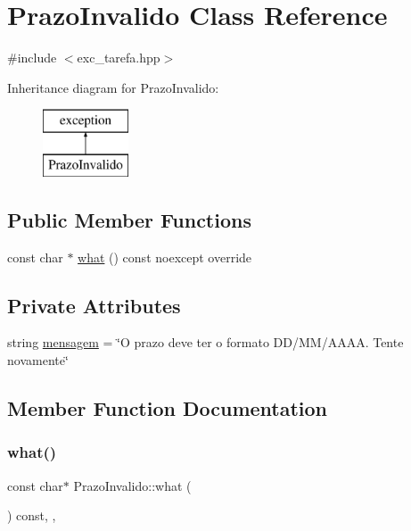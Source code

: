 \hypertarget{classPrazoInvalido}{}\section{Prazo\+Invalido Class Reference}
\label{classPrazoInvalido}


{\ttfamily \#include $<$exc\+\_\+tarefa.\+hpp$>$}

Inheritance diagram for Prazo\+Invalido\+:\begin{figure}[H]
\begin{center}
\leavevmode
\includegraphics[height=2.000000cm]{classPrazoInvalido}
\end{center}
\end{figure}
\subsection*{Public Member Functions}
\begin{DoxyCompactItemize}
\item 
const char $\ast$ \hyperlink{classPrazoInvalido_a17083a87d16651f20e9f1aac6edcea4c}{what} () const noexcept override
\end{DoxyCompactItemize}
\subsection*{Private Attributes}
\begin{DoxyCompactItemize}
\item 
string \hyperlink{classPrazoInvalido_af2bb20a8cc0b09f0b348e0ea2f9d18e8}{mensagem} = \char`\"{}O prazo deve ter o formato \textquotesingle{}DD/MM/A\+A\+AA\textquotesingle{}. Tente novamente\char`\"{}
\end{DoxyCompactItemize}


\subsection{Member Function Documentation}
\mbox{\label{classPrazoInvalido_a17083a87d16651f20e9f1aac6edcea4c}} 
\subsubsection{\texorpdfstring{what()}{what()}}
{\footnotesize\ttfamily const char$\ast$ Prazo\+Invalido\+::what (\begin{DoxyParamCaption}{ }\end{DoxyParamCaption}) const\hspace{0.3cm}{\ttfamily [inline]}, {\ttfamily [override]}, {\ttfamily [noexcept]}}



